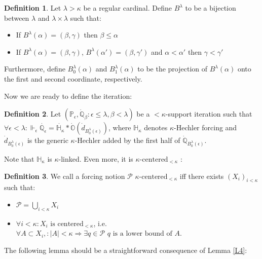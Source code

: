 \documentclass[12pt,a4paper]{scrartcl}
\theoremstyle{definition}
\newtheorem{definition}{Definition}[section]
\numberwithin{equation}{section}
\begin{document}
\begin{definition}
Let $\lambda > \kappa$ be a regular cardinal. Define $B^\lambda$ to be a bijection between $\lambda$ and $\lambda \times \lambda$ such that:
\begin{itemize}
\item If $B^\lambda(\alpha)=(\beta,\gamma)$ then $\beta \leq \alpha$
\item If $B^\lambda(\alpha)=(\beta, \gamma)$, $B^\lambda(\alpha')=(\beta, \gamma')$ and $\alpha < \alpha'$ then $\gamma < \gamma'$
\end{itemize}
Furthermore, define $B_0^\lambda(\alpha)$ and $B_1^\lambda(\alpha)$ to be the projection of $B^\lambda(\alpha)$ onto the first and second coordinate, respectively.
\end{definition}

Now we are ready to define the iteration:

\begin{definition}
Let $(\mathbb{P}_\epsilon, \dot{\mathbb{Q}}_\beta \colon \epsilon \leq \lambda, \beta < \lambda)$ be a ${<}\kappa$-support iteration such that $\forall \epsilon < \lambda  \colon \Vdash_\epsilon \dot{\mathbb{Q}_\epsilon}= \dot{\mathbb{H}_\kappa} * \dot{\mathbb{O}}(\dot{d}_{B_0^\lambda(\epsilon)})$, where $\mathbb{H}_\kappa$ denotes $\kappa$-Hechler forcing and $\dot{d}_{B_0^\lambda(\epsilon)}$ is the generic $\kappa$-Hechler added by the first half of $\dot{\mathbb{Q}}_{B_0^\lambda(\epsilon)}$.
\end{definition}

Note that $\mathbb{H}_\kappa$ is $\kappa$-linked. Even more, it is $\kappa$-$\text{centered}_{<\kappa}$ :

\begin{definition} \label{D1}
We call a forcing notion $\mathcal{P}$ $\kappa$-$\text{centered}_{<\kappa}$ iff there exists $(X_i)_{i<\kappa}$ such that:
\begin{itemize}
\item $\mathcal{P}= \bigcup_{i< \kappa} X_i$
\item $\forall i < \kappa \colon X_i \,\, \text{is} \,\, \text{centered}_{<\kappa}$, i.e. $\forall A \subset  X_i, \colon \vert A \vert < \kappa \Rightarrow \exists q \in \mathcal{P} \,\, q \,\, \text{is a lower bound of} \,\, A$.
\end{itemize}
\end{definition}

The following lemma should be a straightforward consequence of Lemma \ref{L4}:
\end{document}
